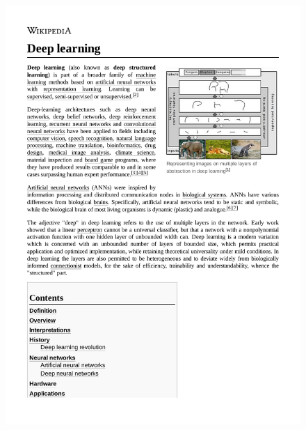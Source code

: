 \documentclass[12pt,a4paper]{article}
\begin{document}
\begin{figure}[h]
\centering
	\includegraphics[scale=0.6]{courses/Deep_learning.pdf}

\end{figure}
\end{document}

